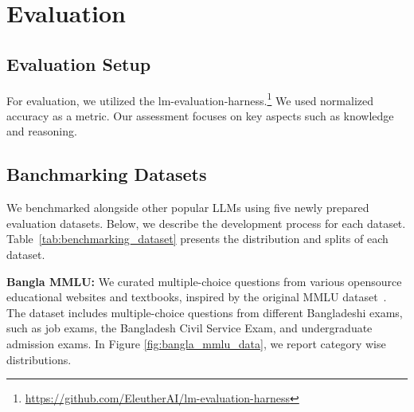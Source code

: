 \section{Evaluation}

\subsection{Evaluation Setup}
For evaluation, we utilized the lm-evaluation-harness.\footnote{\url{https://github.com/EleutherAI/lm-evaluation-harness}} We used normalized accuracy as a metric. Our assessment focuses on key aspects such as knowledge and reasoning.

\subsection{Banchmarking Datasets}
We benchmarked \titu{} alongside other popular LLMs using five newly prepared evaluation datasets. 
Below, we describe the development process for each dataset. Table~\ref{tab:benchmarking_dataset} presents the distribution and splits of each dataset.



\noindent \textbf{Bangla MMLU:} 
We curated multiple-choice questions from various opensource educational websites
and textbooks, inspired by the original MMLU dataset~\cite{hendrycks2020measuring}. The dataset includes multiple-choice questions from different Bangladeshi exams, such as job exams, the Bangladesh Civil Service Exam, and undergraduate admission exams. In Figure \ref{fig:bangla_mmlu_data}, we report category wise distributions. 


